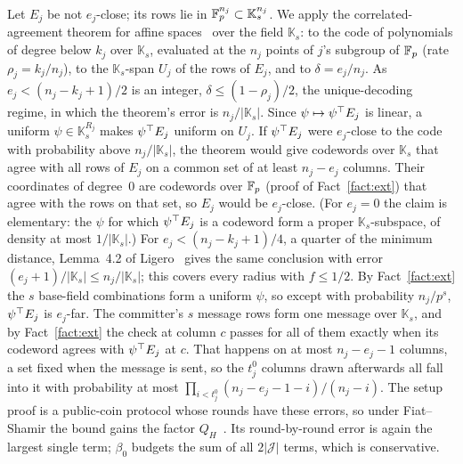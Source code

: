  Let $E_j$ be not $e_j$-close; its rows lie in $\mathbb{F}_p^{n_j}\subset\mathbb K_s^{n_j}$. We
apply the correlated-agreement theorem for affine spaces~\cite[Thm.~1.6]{bciks20} over the field
$\mathbb K_s$: to the code of polynomials of degree below $k_j$ over $\mathbb K_s$, evaluated at
the $n_j$ points of $j$'s subgroup of $\mathbb{F}_p$ (rate $\rho_j=k_j/n_j$), to the $\mathbb K_s$-span
$U_j$ of the rows of $E_j$, and to $\delta=e_j/n_j$. As $e_j<(n_j-k_j+1)/2$ is an integer,
$\delta\le(1-\rho_j)/2$, the unique-decoding regime, in which the theorem's error is
$n_j/|\mathbb K_s|$. Since $\psi\mapsto\psi^\top E_j$ is linear, a uniform $\psi\in\mathbb K_s^{R_j}$
makes $\psi^\top E_j$ uniform on $U_j$. If $\psi^\top E_j$ were $e_j$-close to the code with
probability above $n_j/|\mathbb K_s|$, the theorem would give codewords over $\mathbb K_s$ that
agree with all rows of $E_j$ on a common set of at least $n_j-e_j$ columns. Their coordinates of
degree~0 are codewords over $\mathbb{F}_p$ (proof of Fact~\ref{fact:ext}) that agree with the rows on that
set, so $E_j$ would be $e_j$-close. (For $e_j=0$ the claim is elementary: the $\psi$ for which
$\psi^\top E_j$ is a codeword form a proper $\mathbb K_s$-subspace, of density at most
$1/|\mathbb K_s|$.) For $e_j<(n_j-k_j+1)/4$, a quarter of the minimum distance, Lemma~4.2 of
Ligero~\cite{ligero} gives the same conclusion with error $(e_j+1)/|\mathbb K_s|\le
n_j/|\mathbb K_s|$; this covers every radius with $f\le1/2$. By Fact~\ref{fact:ext} the $s$
base-field combinations form a uniform $\psi$, so except with probability $n_j/p^s$, $\psi^\top E_j$
is $e_j$-far. The committer's $s$ message rows form one message over $\mathbb K_s$, and by
Fact~\ref{fact:ext} the check at column $c$ passes for all of them exactly when its codeword agrees
with $\psi^\top E_j$ at $c$. That happens on at most $n_j-e_j-1$ columns, a set fixed when the message
is sent, so the $t^0_j$ columns drawn afterwards all fall into it with probability at most
$\prod_{i<t^0_j}(n_j-e_j-1-i)/(n_j-i)$. The setup proof is a public-coin protocol whose rounds have
these errors, so under Fiat--Shamir the bound gains the factor $Q_H$~\cite{canetti2019fs,bcs16}. Its
round-by-round error is again the largest single term; $\beta_0$ budgets the sum of all
$2|\mathcal J|$ terms, which is conservative.


